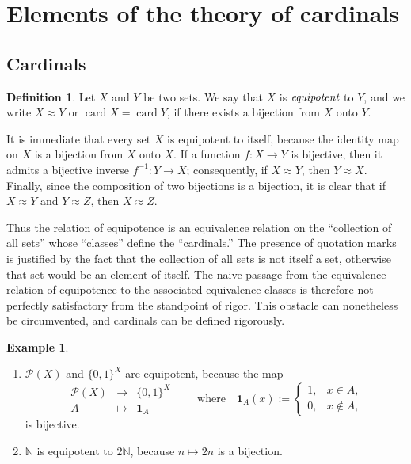 \documentclass[12pt]{article}
\theoremstyle{definition}
\newtheorem{definition}{Definition}[section]
\newtheorem{example}{Example}[section]
\begin{document}
\section{Elements of the theory of cardinals}
\subsection{Cardinals}
\begin{definition}
Let $X$ and $Y$ be two sets.
We say that $X$ is $\emph{equipotent}$ to $Y$, and we write $X \approx Y$ or $\operatorname{card} X=\operatorname{card} Y$, if there exists a bijection from $X$ onto $Y$.
\end{definition}

It is immediate that every set $X$ is equipotent to itself, because the identity map on $X$ is a bijection from $X$ onto $X$.
If a function $f:X\to Y$ is bijective, then it admits a bijective inverse $f^{-1}:Y\to X$; consequently, if $X\approx Y$, then $Y\approx X$.
Finally, since the composition of two bijections is a bijection, it is clear that if $X\approx Y$ and $Y\approx Z$, then $X\approx Z$.

Thus the relation of equipotence is an equivalence relation on the ``collection of all sets'' whose ``classes'' define the ``cardinals.''
The presence of quotation marks is justified by the fact that the collection of all sets is not itself a set, otherwise that set would be an element of itself.
The naive passage from the equivalence relation of equipotence to the associated equivalence classes is therefore not perfectly satisfactory from the standpoint of rigor.
This obstacle can nonetheless be circumvented, and cardinals can be defined rigorously.

\begin{example}
\begin{enumerate}[leftmargin=2em,label=\arabic*.]
\item $\mathcal P(X)$ and $\{0,1\}^{X}$ are equipotent, because the map
\[
\begin{array}{rcl}
\mathcal P(X) &\longrightarrow& \{0,1\}^{X} \\
A &\longmapsto& \mathbf 1_A
\end{array}
\qquad\text{where}\quad
\mathbf 1_A(x):=\begin{cases}
1,& x\in A,\\[2pt]
0,& x\notin A,
\end{cases}
\]
is bijective.
\item $\mathbb N$ is equipotent to $2\mathbb N$, because $n\mapsto 2n$ is a bijection.
\end{enumerate}
\end{example}
\end{document}
